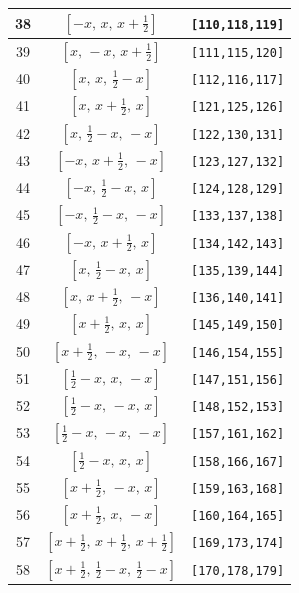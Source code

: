 \documentclass[fleqn,8pt]{jsarticle}
\begin{document}
\begin{longtable}{ccc}
38 & $\left[ - x,\, x,\, x + \frac{1}{2} \right]$ & {\tt [110,118,119]} \\ \hline
39 & $\left[ x,\, - x,\, x + \frac{1}{2} \right]$ & {\tt [111,115,120]} \\ \hline
40 & $\left[ x,\, x,\, \frac{1}{2} - x \right]$ & {\tt [112,116,117]} \\ \hline
41 & $\left[ x,\, x + \frac{1}{2},\, x \right]$ & {\tt [121,125,126]} \\ \hline
42 & $\left[ x,\, \frac{1}{2} - x,\, - x \right]$ & {\tt [122,130,131]} \\ \hline
43 & $\left[ - x,\, x + \frac{1}{2},\, - x \right]$ & {\tt [123,127,132]} \\ \hline
44 & $\left[ - x,\, \frac{1}{2} - x,\, x \right]$ & {\tt [124,128,129]} \\ \hline
45 & $\left[ - x,\, \frac{1}{2} - x,\, - x \right]$ & {\tt [133,137,138]} \\ \hline
46 & $\left[ - x,\, x + \frac{1}{2},\, x \right]$ & {\tt [134,142,143]} \\ \hline
47 & $\left[ x,\, \frac{1}{2} - x,\, x \right]$ & {\tt [135,139,144]} \\ \hline
48 & $\left[ x,\, x + \frac{1}{2},\, - x \right]$ & {\tt [136,140,141]} \\ \hline
49 & $\left[ x + \frac{1}{2},\, x,\, x \right]$ & {\tt [145,149,150]} \\ \hline
50 & $\left[ x + \frac{1}{2},\, - x,\, - x \right]$ & {\tt [146,154,155]} \\ \hline
51 & $\left[ \frac{1}{2} - x,\, x,\, - x \right]$ & {\tt [147,151,156]} \\ \hline
52 & $\left[ \frac{1}{2} - x,\, - x,\, x \right]$ & {\tt [148,152,153]} \\ \hline
53 & $\left[ \frac{1}{2} - x,\, - x,\, - x \right]$ & {\tt [157,161,162]} \\ \hline
54 & $\left[ \frac{1}{2} - x,\, x,\, x \right]$ & {\tt [158,166,167]} \\ \hline
55 & $\left[ x + \frac{1}{2},\, - x,\, x \right]$ & {\tt [159,163,168]} \\ \hline
56 & $\left[ x + \frac{1}{2},\, x,\, - x \right]$ & {\tt [160,164,165]} \\ \hline
57 & $\left[ x + \frac{1}{2},\, x + \frac{1}{2},\, x + \frac{1}{2} \right]$ & {\tt [169,173,174]} \\ \hline
58 & $\left[ x + \frac{1}{2},\, \frac{1}{2} - x,\, \frac{1}{2} - x \right]$ & {\tt [170,178,179]} \\ \hline

\end{longtable}
\end{document}
